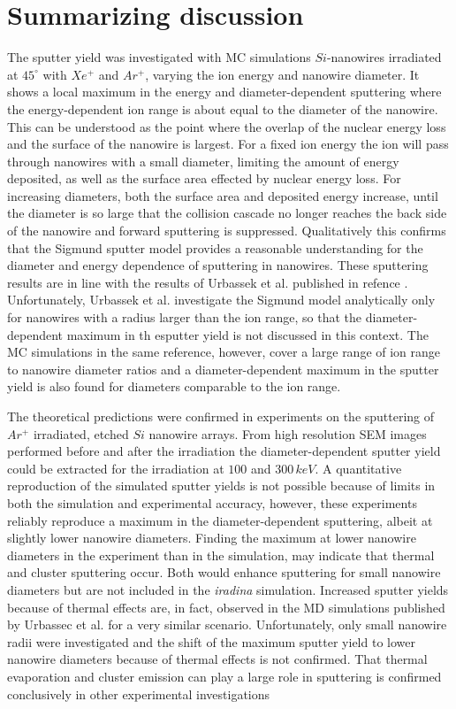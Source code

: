 \section{Summarizing discussion}

The sputter yield was investigated with MC simulations $Si$-nanowires irradiated at $45^\circ$ with $Xe^+$ and $Ar^+$, varying the ion energy and nanowire diameter. It shows a local maximum in the energy and diameter-dependent sputtering where the energy-dependent ion range is about equal to the diameter of the nanowire. This can be understood as the point where the overlap of the nuclear energy loss and the surface of the nanowire is largest. For a fixed ion energy the ion will pass through nanowires with a small diameter, limiting the amount of energy deposited, as well as the surface area effected by nuclear energy loss. For increasing diameters, both the surface area and deposited energy increase, until the diameter is so large that the collision cascade no longer reaches the back side of the nanowire and forward sputtering is suppressed. Qualitatively this confirms that the Sigmund sputter model provides a reasonable understanding for the diameter and energy dependence of sputtering in nanowires. These sputtering results are in line with the results of Urbassek et al. published in refence \cite{urbassek_sputter_2015}. Unfortunately, Urbassek et al. investigate the Sigmund model analytically only for nanowires with a radius larger than the ion range, so that the diameter-dependent maximum in th esputter yield is not discussed in this context. The MC simulations in the same reference, however, cover a large range of ion range to nanowire diameter ratios and a diameter-dependent maximum in the sputter yield is also found for diameters comparable to the ion range. 
 
The theoretical predictions were confirmed in experiments on the sputtering of $Ar^+$ irradiated, etched $Si$ nanowire arrays. From high resolution SEM images performed before and after the irradiation the diameter-dependent sputter yield could be extracted for the irradiation at $100$ and $300\,keV$. A quantitative reproduction of the simulated sputter yields is not possible because of limits in both the simulation and experimental accuracy, however, these experiments reliably reproduce a maximum in the diameter-dependent sputtering, albeit at slightly lower nanowire diameters. Finding the maximum at lower nanowire diameters in the experiment than in the simulation, may indicate that thermal and cluster sputtering occur. Both would enhance sputtering for small nanowire diameters but are not included in the \emph{iradina} simulation. Increased sputter yields because of thermal effects are, in fact, observed in the MD simulations published by Urbassec et al. \cite{urbassek_sputter_2015} for a very similar scenario. Unfortunately, only small nanowire radii were investigated and the shift of the maximum sputter yield to lower nanowire diameters because of thermal effects is not confirmed. That thermal evaporation and cluster emission can play a large role in sputtering is confirmed conclusively in other experimental investigations \cite{greaves_enhanced_2013,ilinov_sputtering_2014,anders_sputtering_2015,johannes_ion_2015}

